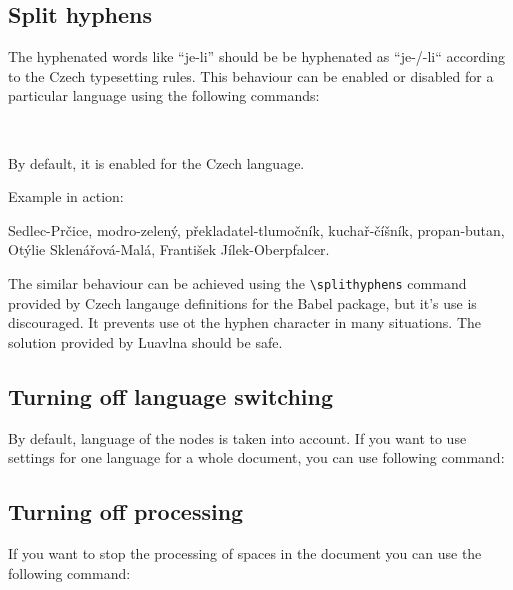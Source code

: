 \documentclass[12pt]{ltxdoc}
\newenvironment{mycode}{
	\medskip%
	\parindent=0pt%
}{\medskip}
\begin{document}
\subsection{Split hyphens}

The hyphenated words like ``je-li'' should be be hyphenated as ``je-/-li``
according to the Czech typesetting rules. This behaviour can be enabled or disabled for a particular
language using the following commands:

\begin{mycode}
  \cmd{\enablesplithyphens}\\
  \cmd{\disablesplithyphens}
\end{mycode}

By default, it is enabled for the Czech language.

Example in action:

\begin{minipage}{3in}
   Sedlec-Prčice, modro-zelený,  překladatel-tlumočník, kuchař-číšník, propan-butan,                                                                                          
   Otýlie Sklenářová-Malá, František Jílek-Oberpfalcer.
\end{minipage}

The similar behaviour can be achieved using the \verb|\splithyphens|  command
provided by Czech langauge definitions for the Babel package, but it's use is
discouraged. It prevents use ot the hyphen character in many situations. The
solution provided by Luavlna should be safe.


\subsection{Turning off language switching}

By default, language of the nodes is taken into account. If you want to use
settings for one language for a whole document, you can use following command:

\begin{mycode}
\cmd{\preventsinglelang}
\end{mycode}

\subsection{Turning off processing}

If you want to stop the processing of spaces in the document you can use the following command:
\end{document}
